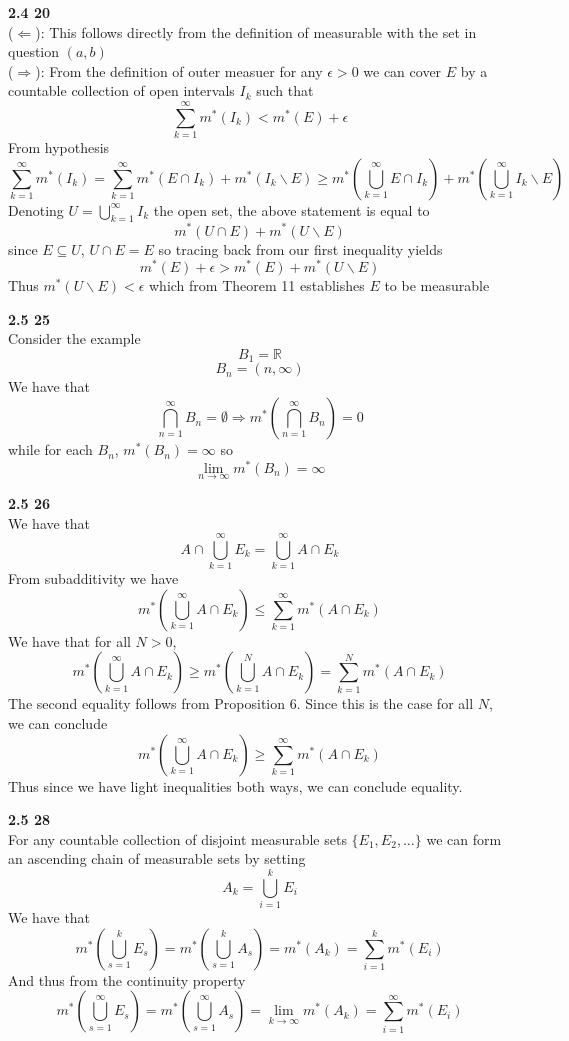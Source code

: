\documentclass[12pt]{article}
\newenvironment{ques}[1]{\textbf{#1}\vspace{1 mm}\\ }{\bigskip}
\theoremstyle{definition}
\renewcommand{\l}{\left }
\renewcommand{\r}{\right }
\newcommand{\R}{\mathbb R}
\renewcommand{\-}{\backslash}
\begin{document}
\begin{ques}{2.4 20}
	($\Leftarrow$): This follows directly from the definition of measurable
	with the set in question $(a,b)$\\
	($\Rightarrow$): From the definition of outer measuer for any $\epsilon >
	0$ we can cover $E$ by a countable collection of open intervals $I_k$ such that
	$$\sum_{k=1}^\infty m^*(I_k) < m^*(E) + \epsilon$$
	From hypothesis
	$$\sum_{k=1}^\infty m^*(I_k) = \sum_{k=1}^\infty m^*(E \cap I_k) + m^*(I_k
	\backslash E) \geq m^*\l(\bigcup_{k=1}^\infty E \cap I_k \r) +
	m^*\l(\bigcup_{k=1}^\infty I_k \backslash E \r)$$
	Denoting $U = \bigcup_{k=1}^\infty I_k$ the open set, the above statement
	is equal to 
	$$m^*(U \cap E) + m^*(U \backslash E)$$
	since $E \subseteq U$, $U \cap E = E$ so tracing back from our first
	inequality yields
	$$m^*(E) + \epsilon > m^*(E) + m^*(U \backslash E)$$
	Thus $m^*(U \backslash E) < \epsilon$ which from Theorem 11 establishes $E$
	to be measurable
\end{ques}

\begin{ques}{2.5 25}
	Consider the example 
	$$B_1 = \R$$
	$$B_n = (n, \infty)$$
	We have that
	$$\bigcap_{n=1}^\infty B_n = \emptyset \Rightarrow
	m^*\l(\bigcap_{n=1}^\infty B_n\r) = 0$$
	while for each $B_n$, $m^*(B_n) = \infty$ so
	$$\lim_{n \to \infty} m^*(B_n) = \infty$$
\end{ques}

\begin{ques}{2.5 26}
	We have that 
	$$A \cap  \bigcup_{k=1}^\infty E_k = \bigcup_{k=1}^\infty A \cap E_k$$
	From subadditivity we have
	$$m^*\l(\bigcup_{k=1}^\infty A \cap E_k\r) \leq \sum_{k=1}^\infty m^*(A
	\cap E_k)$$
	We have that for all $N > 0$,
	$$m^*\l(\bigcup_{k=1}^\infty A \cap E_k\r) \geq m^*\l(\bigcup_{k=1}^N A
	\cap E_k \r) = \sum_{k=1}^N m^*(A \cap E_k)$$
	The second equality follows from Proposition 6. Since this is the case for
	all $N$, we can conclude
	$$m^*\l(\bigcup_{k=1}^\infty A \cap E_k\r) \geq \sum_{k=1}^\infty m^*(A
	\cap E_k)$$
	Thus since we have light inequalities both ways, we can conclude equality.\\
\end{ques}

\begin{ques}{2.5 28}
	For any countable collection of disjoint measurable sets $\{E_1, E_2, \dots\}$ 
	we can form an ascending chain of measurable sets by setting 
	$$A_k = \bigcup_{i=1}^k E_i$$
	We have that
	$$m^*\l(\bigcup_{s =1}^k E_s\r) = m^*\l(\bigcup_{s =1}^k A_s\r) = m^*(A_k)
	= \sum_{i=1}^k m^*(E_i)$$
	And thus from the continuity property
	$$m^*\l(\bigcup_{s =1}^\infty E_s\r) = m^*\l(\bigcup_{s =1}^\infty A_s\r) =
	\lim_{k \to \infty} m^*(A_k) = \sum_{i=1}^\infty m^*(E_i)$$
\end{ques}
\end{document}
